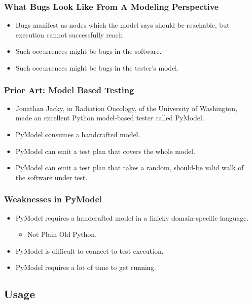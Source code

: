 \begin{frame}
  \frametitle{What Bugs Look Like From A Modeling Perspective}
  \begin{itemize}
    \item Bugs manifest as nodes which the model says should be reachable, but execution cannot successfully reach.
    \item Such occurrences might be bugs in the software.
    \item Such occurrences might be bugs in the tester's model.
  \end{itemize}
\end{frame}

\begin{frame}
  \frametitle{Prior Art: Model Based Testing}
  \begin{itemize}
    \item Jonathan Jacky, in Radiation Oncology, of the University of Washington, made an excellent Python model-based tester called PyModel.
    \item PyModel consumes a handcrafted model.
    \item PyModel can emit a test plan that covers the whole model.
    \item PyModel can emit a test plan that takes a random, should-be valid walk of the software under test.
  \end{itemize}
\end{frame}

\begin{frame}
  \frametitle{Weaknesses in PyModel}
  \begin{itemize}
    \item PyModel requires a handcrafted model in a finicky domain-specific language.
    \begin{itemize}
      \item Not Plain Old Python.
    \end{itemize}
    \item PyModel is difficult to connect to test execution.
    \item PyModel requires a lot of time to get running.
  \end{itemize}
\end{frame}

\subsection{Usage}

